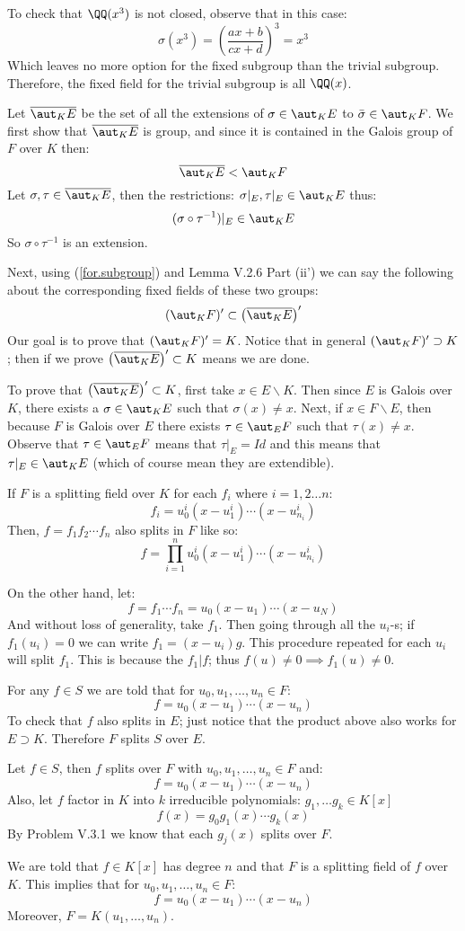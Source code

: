 To check that $\QQ(x^3)$ is not closed, observe that in this case:
$$\sigma(x^3) = \left( \frac{ax+b}{cx+d}\right)^3=x^3$$
Which leaves no more option for the fixed subgroup than the trivial subgroup. Therefore, the fixed field for the trivial subgroup is all $\QQ(x)$.

Let $\overline{\aut_K E}$ be the set of all the extensions of $\sigma\in \aut_KE$ to $\bar\sigma\in \aut_KF$. We first show that $\overline{\aut_K E}$ is group, and since it is contained in the Galois group of $F$ over $K$ then:
\begin{equation}\label{for.subgroup}
\overline{\aut_K E}<\aut_KF
\end{equation}
Let $\sigma, \tau \in \overline{\aut_K E}$, then the restrictions: $\sigma|_E,\tau|_E\in \aut_KE$ thus:
$$(\sigma\circ\tau^{-1})|_E\in \aut_KE$$
So $\sigma\circ\tau^{-1}$ is an extension.

Next, using (\ref{for.subgroup}) and Lemma V.2.6 Part (ii') we can say the following about the corresponding fixed fields of these two groups:
$$(\aut_KF)' \subset \left(\overline{\aut_K E}\right)'$$
Our goal is to prove that $(\aut_KF)'=K$. Notice that in general $(\aut_KF)'\supset K$; then if we prove $\left(\overline{\aut_K E}\right)'\subset K$ means we are done.

To prove that $\left(\overline{\aut_K E}\right)'\subset K$, first take $x\in E\backslash K$. Then since $E$ is Galois over $K$, there exists a $\sigma\in \aut_KE$ such that $\sigma(x)\neq x$. Next, if $x\in F\backslash E$, then because $F$ is Galois over $E$ there exists $\tau\in \aut_EF$ such that $\tau(x)\neq x$. Observe that $\tau\in \aut_EF$ means that $\tau|_E= Id$ and this means that $\tau|_E\in \aut_KE$ (which of course mean they are extendible).

If $F$ is a splitting field over $K$  for each $f_i$ where $i=1,2\ldots n$:
$$f_i = u_0^i(x-u_1^i)\cdots (x-u_{n_i}^i)$$
Then,  $f=f_1f_2\cdots f_n$ also splits in $F$ like so:
$$f=\prod_{i=1}^n u_0^i(x-u_1^i)\cdots (x-u_{n_i}^i)$$

On the other hand, let:
$$f= f_1\cdots f_n =  u_0(x-u_1)\cdots (x-u_N)$$
And without loss of generality, take $f_1$. 
Then going through all the $u_i$-s; if $f_1(u_i)=0$ we can write $f_1 = (x-u_i)g$. 
This procedure repeated for each $u_i$ will split $f_1$. 
This is because the $f_1|f$; thus $f(u)\neq 0 \implies f_1(u)\neq 0$.

For any $f\in S$ we are told that for $u_0,u_1,\ldots, u_n\in F$:
$$f=u_0(x-u_1)\cdots (x-u_n)$$
To check that $f$ also splits in $E$; just notice that the product above also works for $E\supset K$. 
Therefore $F$ splits $S$ over $E$.

Let $f\in S$, then $f$ splits over $F$ with $u_0,u_1,\ldots,u_n\in F$ and:
$$f=u_0(x-u_1)\cdots (x-u_n)$$
Also, let $f$ factor in $K$ into $k$ irreducible polynomials: $g_1,\ldots g_k\in K[x]$
$$f(x)=g_0g_1(x)\cdots g_{k}(x)$$
By Problem V.3.1 we know that each $g_j(x)$ splits over $F$.

We are told that $f\in K[x]$ has degree $n$ and that $F$ is a splitting field of $f$ over $K$. 
This implies that for $u_0,u_1,\ldots,u_n\in F$:
$$f=u_0(x-u_1)\cdots (x-u_n)$$
Moreover, $F=K(u_1,\ldots,u_n)$. 
